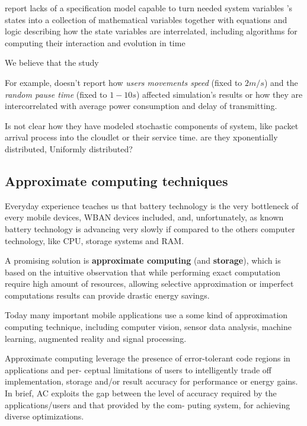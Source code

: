 \documentclass[sigchi]{acmart}
\begin{document}
\citet{MSAReport} report lacks of a specification model capable to turn needed system variables 
’s states into a collection of mathematical variables together with equations and logic describing how the state variables are interrelated, including algorithms for computing their interaction and evolution in time

We believe that the study 

For example, \citet{MSAReport} doesn't report how \textit{users movements speed} (fixed to $2 m/s$) and the \textit{random pause time} (fixed to $1-10 s$) affected simulation's results or how they are intercorrelated with average power consumption and delay of transmitting.

Is not clear how they have modeled stochastic components of system, like packet arrival process into the cloudlet or their service time.
are they xponentially distributed, Uniformly distributed?


\subsection{Approximate computing techniques}

Everyday experience teaches us that battery technology is the very bottleneck of every mobile devices, WBAN devices included, and, unfortunately, as known battery technology is advancing very slowly if compared to the others computer technology, like CPU, storage systems and RAM.

A promising solution is \textbf{approximate computing} (and \textbf{storage}), which is based on the intuitive observation that while performing exact computation require high amount of resources, allowing selective approximation or imperfect computations results can provide drastic energy savings.

Today many important mobile applications use a some kind of approximation computing technique, including computer vision, sensor data analysis, machine learning, augmented reality and signal processing. 

Approximate computing leverage the presence of error-tolerant code regions in applications and per-
ceptual limitations of users to intelligently trade off implementation, storage and/or
result accuracy for performance or energy gains. In brief, AC exploits the gap between
the level of accuracy required by the applications/users and that provided by the com-
puting system, for achieving diverse optimizations.








\appendix
\end{document}
